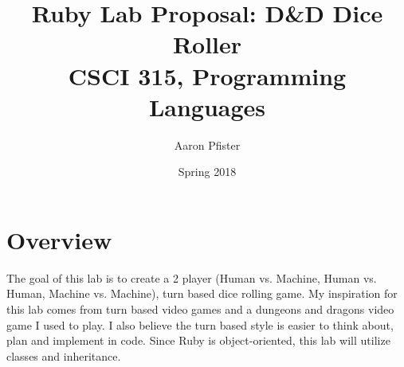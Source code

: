 \documentclass{article}
\begin{document}
\title{Ruby Lab Proposal: D\&D Dice Roller \\ \large{\sc CSCI 315, Programming Languages}}
\author{Aaron Pfister}
\date{Spring 2018}
\maketitle

\section*{Overview}
The goal of this lab is to create a 2 player (Human vs. Machine, Human vs. Human, Machine vs. Machine), turn based dice rolling game. My inspiration for this lab comes from turn based video games and a dungeons and dragons video game I used to play. I also believe the turn based style is easier to think about, plan and implement in code. Since Ruby is object-oriented, this lab will utilize classes and inheritance. 
\end{document}

